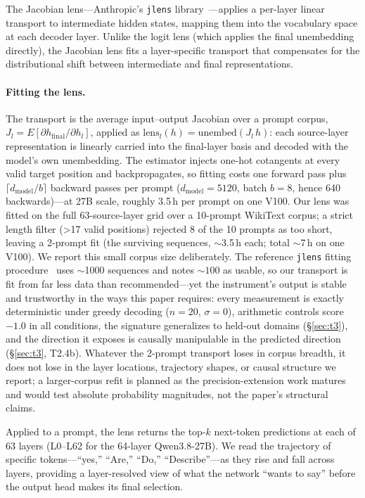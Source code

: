\documentclass[11pt,a4paper]{article}
\begin{document}
The Jacobian lens---Anthropic's \texttt{jlens} library~\cite{jacobianlens2026}---applies a per-layer linear transport to intermediate hidden states, mapping them into the vocabulary space at each decoder layer. Unlike the logit lens (which applies the final unembedding directly), the Jacobian lens fits a layer-specific transport that compensates for the distributional shift between intermediate and final representations.

\paragraph{Fitting the lens.} The transport is the average input--output Jacobian over a prompt corpus, $J_l = E[\partial h_{\mathrm{final}} / \partial h_l]$, applied as $\mathrm{lens}_l(h) = \mathrm{unembed}(J_l\, h)$: each source-layer representation is linearly carried into the final-layer basis and decoded with the model's own unembedding. The estimator injects one-hot cotangents at every valid target position and backpropagates, so fitting costs one forward pass plus $\lceil d_{\mathrm{model}} / b \rceil$ backward passes per prompt ($d_{\mathrm{model}}{=}5120$, batch $b{=}8$, hence 640 backwards)---at 27B scale, roughly 3.5\,h per prompt on one V100. Our lens was fitted on the full 63-source-layer grid over a 10-prompt WikiText corpus; a strict length filter (>17 valid positions) rejected 8 of the 10 prompts as too short, leaving a 2-prompt fit (the surviving sequences, ${\sim}$3.5\,h each; total ${\sim}$7\,h on one V100). We report this small corpus size deliberately. The reference \texttt{jlens} fitting procedure~\cite{jacobianlens2026} uses ${\sim}$1000 sequences and notes ${\sim}100$ as usable, so our transport is fit from far less data than recommended---yet the instrument's output is stable and trustworthy in the ways this paper requires: every measurement is exactly deterministic under greedy decoding ($n{=}20$, $\sigma{=}0$), arithmetic controls score $-1.0$ in all conditions, the signature generalizes to held-out domains (\S\ref{sec:t3}), and the direction it exposes is causally manipulable in the predicted direction (\S\ref{sec:t3}, T2.4b). Whatever the 2-prompt transport loses in corpus breadth, it does not lose in the layer locations, trajectory shapes, or causal structure we report; a larger-corpus refit is planned as the precision-extension work matures and would test absolute probability magnitudes, not the paper's structural claims.

Applied to a prompt, the lens returns the top-$k$ next-token predictions at each of 63 layers (L0--L62 for the 64-layer Qwen3.8-27B). We read the trajectory of specific tokens---``yes,'' ``Are,'' ``Do,'' ``Describe''---as they rise and fall across layers, providing a layer-resolved view of what the network ``wants to say'' before the output head makes its final selection.
\end{document}
